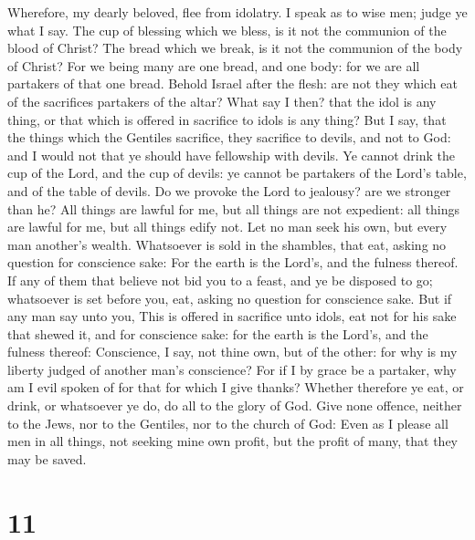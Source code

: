  Wherefore, my dearly beloved, flee from idolatry.
 I speak as to wise men; judge ye what I say.
 The cup of blessing which we bless, is it not the
communion of the blood of Christ? The bread which we break, is it not
the communion of the body of Christ?  For we being many
are one bread, and one body: for we are all partakers of that one bread.
 Behold Israel after the flesh: are not they which eat of
the sacrifices partakers of the altar?  What say I then?
that the idol is any thing, or that which is offered in sacrifice to
idols is any thing?  But I say, that the things which the
Gentiles sacrifice, they sacrifice to devils, and not to God: and I
would not that ye should have fellowship with devils.  Ye
cannot drink the cup of the Lord, and the cup of devils: ye cannot be
partakers of the Lord's table, and of the table of devils.
 Do we provoke the Lord to jealousy? are we stronger than
he?  All things are lawful for me, but all things are not
expedient: all things are lawful for me, but all things edify not.
 Let no man seek his own, but every man another's wealth.
 Whatsoever is sold in the shambles, that eat, asking no
question for conscience sake:  For the earth is the
Lord's, and the fulness thereof.  If any of them that
believe not bid you to a feast, and ye be disposed to go; whatsoever is
set before you, eat, asking no question for conscience sake.
 But if any man say unto you, This is offered in
sacrifice unto idols, eat not for his sake that shewed it, and for
conscience sake: for the earth is the Lord's, and the fulness thereof:
 Conscience, I say, not thine own, but of the other: for
why is my liberty judged of another man's conscience? 
For if I by grace be a partaker, why am I evil spoken of for that for
which I give thanks?  Whether therefore ye eat, or drink,
or whatsoever ye do, do all to the glory of God.  Give
none offence, neither to the Jews, nor to the Gentiles, nor to the
church of God:  Even as I please all men in all things,
not seeking mine own profit, but the profit of many, that they may be
saved.

\hypertarget{section-10}{%
\section{11}\label{section-10}}

